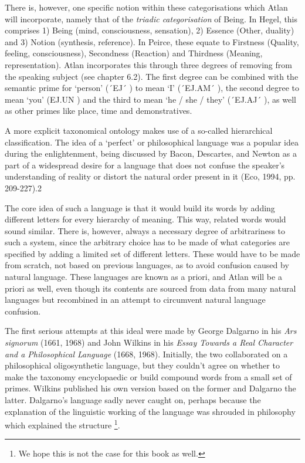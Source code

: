 There is, however, one specific notion within these categorisations which Atlan will incorporate, namely that of the {\it triadic categorisation} of Being. In Hegel, this comprises 1) Being (mind, consciousness, sensation), 2) Essence (Other, duality) and 3) Notion (synthesis, reference). In Peirce, these equate to Firstness (Quality, feeling, consciousness), Secondness (Reaction) and Thirdness (Meaning, representation). Atlan incorporates this through three degrees of removing from the speaking subject (see chapter 6.2). The first degree can be combined with the semantic prime for ‘person’ (´EJ´ \ej) to mean ‘I’ (´EJ.AM´ \ej \am), the second degree to mean ‘you’ (EJ.UN \ej \un) and the third to mean ‘he / she / they’ (´EJ.AJ´ \ej \aj), as well as other primes like place, time and demonstratives. 

A more explicit taxonomical ontology makes use of a so-called hierarchical classification. The idea of a ‘perfect’ or philosophical language was a popular idea during the enlightenment, being discussed by Bacon, Descartes, and Newton as a part of a widespread desire for a language that does not confuse the speaker’s understanding of reality or distort the natural order present in it (Eco, 1994, pp. 209-227).2 

The core idea of such a language is that it would build its words by adding different letters for every hierarchy of meaning. This way, related words would sound similar. There is, however, always a necessary degree of arbitrariness to such a system, since the arbitrary choice has to be made of what categories are specified by adding a limited set of different letters. These would have to be made from scratch, not based on previous languages, as to avoid confusion caused by natural language. These languages are known as a priori, and Atlan will be a priori as well, even though its contents are sourced from data from many natural languages but recombined in an attempt to circumvent natural language confusion.  

The first serious attempts at this ideal were made by George Dalgarno in his {\it Ars signorum} (1661, 1968) and John Wilkins in his \textit{Essay Towards a Real Character and a Philosophical Language} (1668, 1968). Initially, the two collaborated on a philosophical oligosynthetic language, but they couldn’t agree on whether to make the taxonomy encyclopaedic or build compound words from a small set of primes. Wilkins published his own version based on the former and Dalgarno the latter. Dalgarno’s language sadly never caught on, perhaps because the explanation of the linguistic working of the language was shrouded in philosophy which explained the structure \footnote{We hope this is not the case for this book as well.}. 

